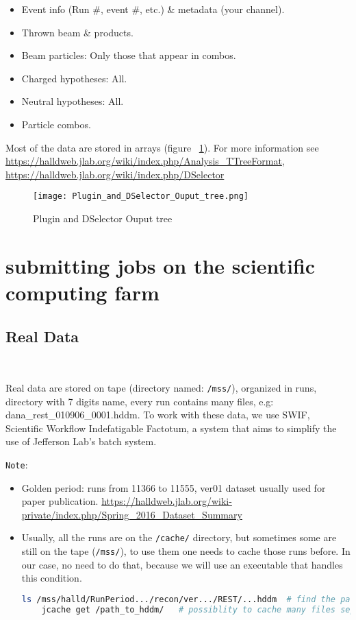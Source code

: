 \documentclass{article}
\begin{document}
\begin{itemize}
\item Event info (Run \#, event \#, etc.) \& metadata (your channel).
\item Thrown beam \& products.
\item Beam particles: Only those that appear in combos.
\item Charged hypotheses: All.
\item Neutral hypotheses: All.
\item Particle combos.
\end{itemize}

Most of the data are stored in arrays (figure ~\ref{fig:2}).
\newline For more information see \url{https://halldweb.jlab.org/wiki/index.php/Analysis_TTreeFormat}, \url{https://halldweb.jlab.org/wiki/index.php/DSelector}
\begin{figure}[h!]
  \centering
  \texttt{[image: Plugin\_and\_DSelector\_Ouput\_tree.png]}
  \caption{Plugin and DSelector Ouput tree}
  \label{fig:2}
\end{figure}
\newpage
\section{submitting jobs on the scientific computing farm}

\subsection{Real Data}

~\par Real data are stored on tape (directory named: \texttt{/mss/}), organized in runs, directory with 7 digits name, every run contains many files, e.g: dana\_rest\_010906\_0001.hddm.
To work with these data, we use SWIF, Scientific Workflow Indefatigable Factotum, a system that aims to simplify the use of Jefferson Lab's batch system.

\texttt{Note}:
\begin{itemize}
\item Golden period: runs from 11366 to 11555, ver01 dataset usually used for paper publication. \url{https://halldweb.jlab.org/wiki-private/index.php/Spring_2016_Dataset_Summary}
\item Usually, all the runs are on the \texttt{/cache/} directory, but sometimes some are still on the tape (\texttt{/mss/}), to use them one needs to cache those runs before. In our case, no need to do that, because we will use an executable that handles this condition.
  \begin{lstlisting}[language=bash]
    ls /mss/halld/RunPeriod.../recon/ver.../REST/...hddm  # find the path
    jcache get /path_to_hddm/   # possiblity to cache many files separated by space
  \end{lstlisting}
\end{itemize}
\end{document}
